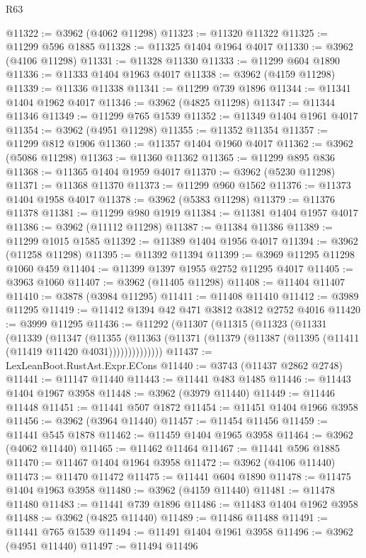 \begin{lexlean}{R63}
\begin{coremodule}
@11322 := @3962 (@4062 @11298)
@11323 := @11320 @11322
@11325 := @11299 @596 @1885
@11328 := @11325 @1404 @1964 @4017
@11330 := @3962 (@4106 @11298)
@11331 := @11328 @11330
@11333 := @11299 @604 @1890
@11336 := @11333 @1404 @1963 @4017
@11338 := @3962 (@4159 @11298)
@11339 := @11336 @11338
@11341 := @11299 @739 @1896
@11344 := @11341 @1404 @1962 @4017
@11346 := @3962 (@4825 @11298)
@11347 := @11344 @11346
@11349 := @11299 @765 @1539
@11352 := @11349 @1404 @1961 @4017
@11354 := @3962 (@4951 @11298)
@11355 := @11352 @11354
@11357 := @11299 @812 @1906
@11360 := @11357 @1404 @1960 @4017
@11362 := @3962 (@5086 @11298)
@11363 := @11360 @11362
@11365 := @11299 @895 @836
@11368 := @11365 @1404 @1959 @4017
@11370 := @3962 (@5230 @11298)
@11371 := @11368 @11370
@11373 := @11299 @960 @1562
@11376 := @11373 @1404 @1958 @4017
@11378 := @3962 (@5383 @11298)
@11379 := @11376 @11378
@11381 := @11299 @980 @1919
@11384 := @11381 @1404 @1957 @4017
@11386 := @3962 (@11112 @11298)
@11387 := @11384 @11386
@11389 := @11299 @1015 @1585
@11392 := @11389 @1404 @1956 @4017
@11394 := @3962 (@11258 @11298)
@11395 := @11392 @11394
@11399 := @3969 @11295 @11298 @1060 @459
@11404 := @11399 @1397 @1955 @2752 @11295 @4017
@11405 := @3963 @1060
@11407 := @3962 (@11405 @11298)
@11408 := @11404 @11407
@11410 := @3878 (@3984 @11295)
@11411 := @11408 @11410
@11412 := @3989 @11295
@11419 := @11412 @1394 @42 @471 @3812 @3812 @2752 @4016
@11420 := @3999 @11295
@11436 := @11292
    (@11307
      (@11315
        (@11323
          (@11331
            (@11339
              (@11347
                (@11355
                  (@11363 (@11371 (@11379 (@11387 (@11395 (@11411 (@11419 @11420 @4031))))))))))))))
@11437 := LexLeanBoot.RustAst.Expr.ECons
@11440 := @3743 (@11437 @2862 @2748)
@11441 := @11147 @11440
@11443 := @11441 @483 @1485
@11446 := @11443 @1404 @1967 @3958
@11448 := @3962 (@3979 @11440)
@11449 := @11446 @11448
@11451 := @11441 @507 @1872
@11454 := @11451 @1404 @1966 @3958
@11456 := @3962 (@3964 @11440)
@11457 := @11454 @11456
@11459 := @11441 @545 @1878
@11462 := @11459 @1404 @1965 @3958
@11464 := @3962 (@4062 @11440)
@11465 := @11462 @11464
@11467 := @11441 @596 @1885
@11470 := @11467 @1404 @1964 @3958
@11472 := @3962 (@4106 @11440)
@11473 := @11470 @11472
@11475 := @11441 @604 @1890
@11478 := @11475 @1404 @1963 @3958
@11480 := @3962 (@4159 @11440)
@11481 := @11478 @11480
@11483 := @11441 @739 @1896
@11486 := @11483 @1404 @1962 @3958
@11488 := @3962 (@4825 @11440)
@11489 := @11486 @11488
@11491 := @11441 @765 @1539
@11494 := @11491 @1404 @1961 @3958
@11496 := @3962 (@4951 @11440)
@11497 := @11494 @11496

\end{coremodule}
\end{lexlean}
